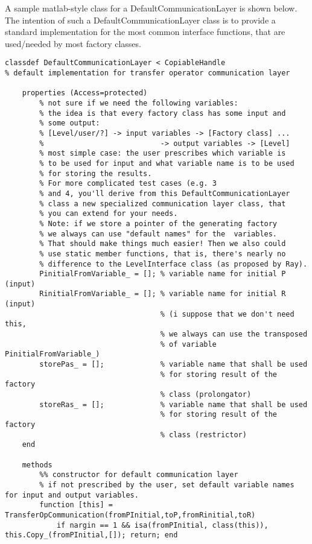 A sample matlab-style class for a DefaultCommunicationLayer is shown below. The intention of such a DefaultCommunicationLayer class is to provide a standard implementation for the most common interface functions, that are used/needed by most factory classes.
\begin{verbatim}
classdef DefaultCommunicationLayer < CopiableHandle
% default implementation for transfer operator communication layer 

    properties (Access=protected)
        % not sure if we need the following variables: 
        % the idea is that every factory class has some input and 
        % some output:
        % [Level/user/?] -> input variables -> [Factory class] ...
        %                           -> output variables -> [Level]
        % most simple case: the user prescribes which variable is
        % to be used for input and what variable name is to be used
        % for storing the results.
        % For more complicated test cases (e.g. 3
        % and 4, you'll derive from this DefaultCommunicationLayer
        % class a new specialized communication layer class, that
        % you can extend for your needs.
        % Note: if we store a pointer of the generating factory
        % we always can use "default names" for the  variables.
        % That should make things much easier! Then we also could
        % use static member functions, that is, there's nearly no
        % difference to the LevelInterface class (as proposed by Ray).
        PinitialFromVariable_ = []; % variable name for initial P (input)
        RinitialFromVariable_ = []; % variable name for initial R (input)
                                    % (i suppose that we don't need this, 
                                    % we always can use the transposed
                                    % of variable PinitialFromVariable_)
        storePas_ = [];             % variable name that shall be used
                                    % for storing result of the factory
                                    % class (prolongator)
        storeRas_ = [];             % variable name that shall be used
                                    % for storing result of the factory
                                    % class (restrictor)
    end

    methods
        %% constructor for default communication layer
        % if not prescribed by the user, set default variable names for input and output variables.
        function [this] = TransferOpCommunication(fromPInitial,toP,fromRinitial,toR)
            if nargin == 1 && isa(fromPInitial, class(this)), this.Copy_(fromPInitial,[]); return; end
            

\end{verbatim}
